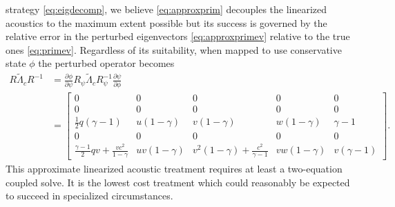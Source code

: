 \documentclass[letterpaper,11pt,nointlimits,reqno]{amsart}
\begin{document}
strategy \eqref{eq:eigdecomp}, we believe \eqref{eq:approxprim} decouples the
linearized acoustics to the maximum extent possible but its success is governed
by the relative error in the perturbed eigenvectors \eqref{eq:approxprimev}
relative to the true ones \eqref{eq:primev}.  Regardless of its suitability,
when mapped to use conservative state $\phi$ the perturbed operator becomes
\begin{align}
  R \tilde\Lambda_c R^{-1}
  &=
  \frac{\partial \phi}{\partial \psi}
  R_\psi \tilde\Lambda_c R_\psi^{-1}
  \frac{\partial \psi}{\partial \phi}
\\
 &=
\begin{bmatrix}
 0 & 0 & 0 & 0 & 0 \\
 0 & 0 & 0 & 0 & 0 \\
 \frac{1}{2} q (\gamma-1) & u(1-\gamma)  & v(1-\gamma)  & w(1-\gamma)  & \gamma-1  \\
 0 & 0 & 0 & 0 & 0 \\
 \frac{\gamma-1}{2} q v +\frac{v c^2}{1-\gamma} & u v (1-\gamma ) & v^2 (1-\gamma)+\frac{c^2}{\gamma-1} & v w (1-\gamma ) & v (\gamma-1 )
\end{bmatrix}
.
\end{align}
This approximate linearized acoustic treatment requires at least a two-equation
coupled solve.  It is the lowest cost treatment which could reasonably be
expected to succeed in specialized circumstances.
\end{document}
